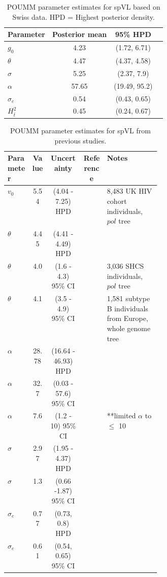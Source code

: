 \documentclass[]{article}
\begin{document}
\begin{table}[H]
\caption{POUMM parameter estimates for spVL based on Swiss data. HPD = Highest posterior density.}
	\begin{tabular}{lccc} \hline 
	Parameter & Posterior mean & 95\% HPD \\ \hline 
	${g_{0}}$ & 4.23 & (1.72, 6.71) \\
	$\theta$ & 4.47 & (4.37, 4.58) \\
	$\sigma$ & 5.25 & (2.37, 7.9) \\
	$\alpha$ & 57.65 & (19.49, 95.2) \\
	$\sigma_e$ & 0.54 & (0.43, 0.65) \\ 
	$H^2_{\bar{t}}$ & 0.45 & (0.24, 0.67) \\ \hline
	\end{tabular}
	\label{tab:POUMM-parameters-our-estimates}
\end{table}

\begin{table}[H]
\caption{POUMM parameter estimates for spVL from previous studies.}
	\begin{tabular}{lcccp{0.35\linewidth}}
	\hline 
	Parameter & Value & Uncertainty & Reference & Notes \\
	\hline 
	$v_0$ & 5.54 & (4.04 - 7.25) HPD & \citet{Mitov2018} & 8,483 UK HIV cohort individuals, $pol$ tree \\
	$\theta$ & 4.45 & (4.41 - 4.49) HPD & \citet{Mitov2018} & \\
	$\theta$ &  4.0 & (1.6 - 4.3) 95\% CI & \citet{Bertels2018} & 3,036 SHCS individuals, $pol$ tree \\
	$\theta$ & 4.1 & (3.5 - 4.9) 95\% CI & \citet{Blanquart2017} & 1,581 subtype B individuals from Europe, whole genome tree \\
	$\alpha$ & 28.78 & (16.64 - 46.93) HPD & \citet{Mitov2018} & \\
	$\alpha$ & 32.7 & (0.03 - 57.6) 95\% CI & \citet{Bertels2018} & \\
	$\alpha$ & 7.6 & (1.2 - 10) 95\% CI & \citet{Blanquart2017} & **limited $\alpha$ to $\le$ 10 \\
	$\sigma$ & 2.97 & (1.95 - 4.37) HPD & \citet{Mitov2018} & \\
	$\sigma$ & 1.3 & (0.66 -1.87) 95\% CI &  \citet{Blanquart2017} & \\
	$\sigma_e$ & 0.77 & (0.73, 0.8) HPD & \citet{Mitov2018} & \\
	$\sigma_e$ & 0.61 & (0.54, 0.65) 95\% CI &  \citet{Blanquart2017} & \\
	\hline 
	\end{tabular}
	\label{tab:POUMMparams-prev-estimated}
\end{table}
\end{document}
